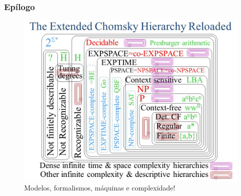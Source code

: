 \documentclass[10pt]{beamer}
\begin{document}
\begin{frame}[fragile]

\frametitle{Epílogo}

\begin{figure}[!ht]
\centering
\includegraphics[height =.65\textheight,width=.8\textwidth]
{figuras/Extended+Chomsky+Hierarchy.jpg}
\caption{Modelos, formalismos, máquinas e complexidade!}
\end{figure}

\end{frame}



\end{document}
